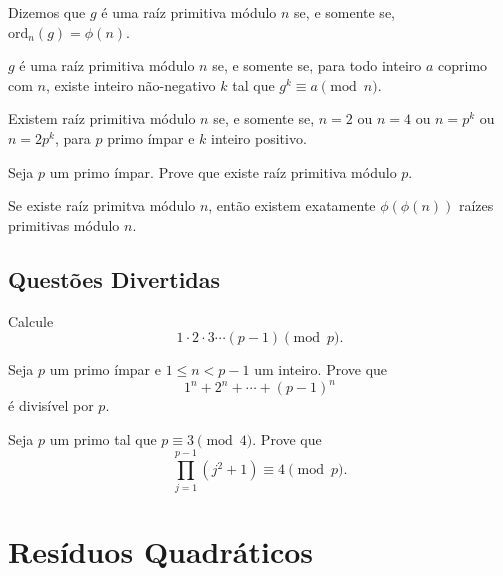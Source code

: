 \documentclass[10pt, a4paper]{report}
\begin{document}
	\begin{defn}
		Dizemos que $g$ é uma raíz primitiva módulo $n$ se, e somente se, $\mathrm{ord}_n(g) = \phi(n)$.
	\end{defn}

	\begin{lem}
		$g$ é uma raíz primitiva módulo $n$ se, e somente se, para todo inteiro $a$ coprimo com $n$, existe inteiro não-negativo $k$ tal que $g^k \equiv a \pmod{n}$.
	\end{lem}

	\begin{thm}\label{thm:crp}
		Existem raíz primitiva módulo $n$ se, e somente se, $n = 2$ ou $n = 4$ ou $n = p^k$ ou $n = 2p^k$, para $p$ primo ímpar e $k$ inteiro positivo.
	\end{thm}

	\begin{exer}
		Seja $p$ um primo ímpar. Prove que existe raíz primitiva módulo $p$.
	\end{exer}

	\begin{lem}
		Se existe raíz primitva módulo $n$, então existem exatamente $\phi(\phi(n))$ raízes primitivas módulo $n$.
	\end{lem}
	
	\newpage
	\section{Questões Divertidas}
	\begin{prob}
		Calcule \[
			1\cdot2\cdot3\cdots(p-1) \pmod{p}.
		\]
	\end{prob}

	\begin{prob}
		Seja $p$ um primo ímpar e $1 \le n < p-1$ um inteiro. Prove que \[
			1^n + 2^n + \cdots + (p-1)^n
		\]
		é divisível por $p$.
	\end{prob}

	\begin{prob}
		Seja $p$ um primo tal que $p \equiv 3 \pmod{4}$. Prove que \[
			\prod_{j=1}^{p-1} \left(j^2 + 1\right) \equiv 4 \pmod{p}.
		\]
	\end{prob}

	\chapter{Resíduos Quadráticos}
\end{document}
